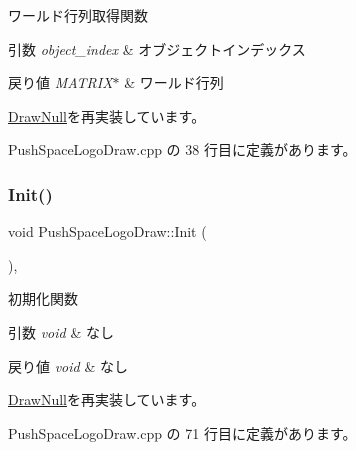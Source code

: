 ワールド行列取得関数 


\begin{DoxyParams}{引数}
{\em object\+\_\+index} & オブジェクトインデックス \\
\hline
\end{DoxyParams}

\begin{DoxyRetVals}{戻り値}
{\em M\+A\+T\+R\+I\+X$\ast$} & ワールド行列 \\
\hline
\end{DoxyRetVals}


\mbox{\hyperlink{class_draw_null_a9aac059eb3b5d1f77e8bd3aa0647cff9}{Draw\+Null}}を再実装しています。



 Push\+Space\+Logo\+Draw.\+cpp の 38 行目に定義があります。

\mbox{\label{class_push_space_logo_draw_a7ad3fe53d9bda4ea16c958bc102ff54e}} 
\subsubsection{\texorpdfstring{Init()}{Init()}}
{\footnotesize\ttfamily void Push\+Space\+Logo\+Draw\+::\+Init (\begin{DoxyParamCaption}{ }\end{DoxyParamCaption})\hspace{0.3cm}{\ttfamily [override]}, {\ttfamily [virtual]}}



初期化関数 


\begin{DoxyParams}{引数}
{\em void} & なし \\
\hline
\end{DoxyParams}

\begin{DoxyRetVals}{戻り値}
{\em void} & なし \\
\hline
\end{DoxyRetVals}


\mbox{\hyperlink{class_draw_null_a20aef1e54c1a158b741bfd731e18efdf}{Draw\+Null}}を再実装しています。



 Push\+Space\+Logo\+Draw.\+cpp の 71 行目に定義があります。

\mbox{\label{class_push_space_logo_draw_a79021c1df43968d6008de74126d53fba}} 

